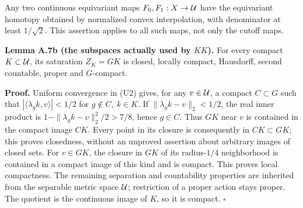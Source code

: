\documentclass[
  11pt,
]{article}
\begin{document}
Any two continuous equivariant maps \(F_0,F_1:X\to{\cal U}\) have the
equivariant homotopy obtained by normalized convex interpolation, with
denominator at least \(1/\sqrt2\). This assertion applies to all such
maps, not only the cutoff maps.

\textbf{Lemma A.7b (the subspaces actually used by \(KK\)).} For every
compact \(K\subset{\cal U}\), its saturation \(Z_K=GK\) is closed,
locally compact, Hausdorff, second countable, proper and \(G\)-compact.

\textbf{Proof.} Uniform convergence in (U2) gives, for any
\(v\in{\cal U}\), a compact \(C\subset G\) such that
\(|\langle\lambda_gk,v\rangle|<1/2\) for \(g\notin C,\ k\in K\). If
\(\|\lambda_gk-v\|_2<1/2\), the real inner product is
\(1-\|\lambda_gk-v\|_2^2/2>7/8\), hence \(g\in C\). Thus \(GK\) near
\(v\) is contained in the compact image \(CK\). Every point in its
closure is consequently in \(CK\subset GK\); this proves closedness,
without an unproved assertion about arbitrary images of closed sets. For
\(v\in GK\), the closure in \(GK\) of its radius-\(1/4\) neighborhood is
contained in a compact image of this kind and is compact. This proves
local compactness. The remaining separation and countability properties
are inherited from the separable metric space \({\cal U}\); restriction
of a proper action stays proper. The quotient is the continuous image of
\(K\), so it is compact. \(\square\)
\end{document}
